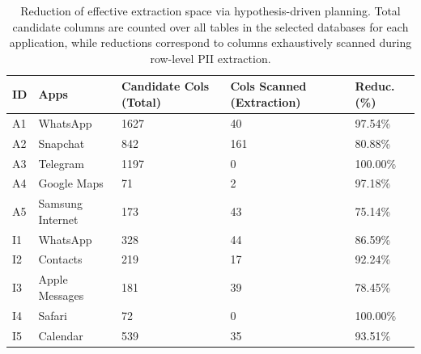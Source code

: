 \begin{table}[th]
\centering
\caption{Reduction of effective extraction space via hypothesis-driven planning. Total candidate columns are counted over all tables in the selected databases for each application, while reductions correspond to columns exhaustively scanned during row-level PII extraction.}
\label{tab:search_space_reduction}
\small
\begin{tabular}{|l|l|p{1.3cm}|p{1.7cm}|p{1.0cm}|}
\hline
\textbf{ID} & \textbf{Apps} & \textbf{Candidate Cols (Total)} & \textbf{Cols Scanned (Extraction)} & \textbf{Reduc. (\%)} \\
\hline
A1 & WhatsApp & 1627 & 40 & 97.54\% \\
\hline
A2 & Snapchat & 842 & 161 & 80.88\% \\
\hline
A3 & Telegram & 1197 & 0 & 100.00\% \\
\hline
A4 & Google Maps & 71 & 2 & 97.18\% \\
\hline
A5 & Samsung Internet & 173 & 43 & 75.14\% \\
\hline
I1 & WhatsApp & 328 & 44 & 86.59\% \\
\hline
I2 & Contacts & 219 & 17 & 92.24\% \\
\hline
I3 & Apple Messages & 181 & 39 & 78.45\% \\
\hline
I4 & Safari & 72 & 0 & 100.00\% \\
\hline
I5 & Calendar & 539 & 35 & 93.51\% \\
\hline
\end{tabular}
\end{table}